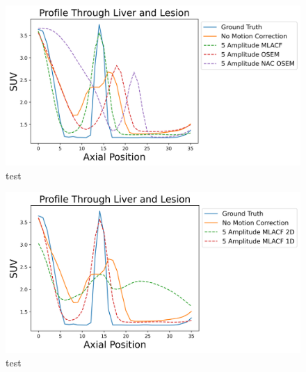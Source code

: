             \begin{figure}
                \centering
                
                \includegraphics[width=1.0\linewidth]{figures/motion_correction_2_results_2_5_amplitude_profile.png}
                
                \captionsetup{singlelinecheck=false}
                \caption{
                    test
                }
                
                \label{fig:test_5_amplitude_profile}
            \end{figure}

            \begin{figure}
                \centering
                
                \includegraphics[width=1.0\linewidth]{figures/motion_correction_2_results_2_1d_vs_2d_profile.png}
                
                \captionsetup{singlelinecheck=false}
                \caption{
                    test
                }
                
                \label{fig:test_1d_vs_2d_profile}
            \end{figure}

